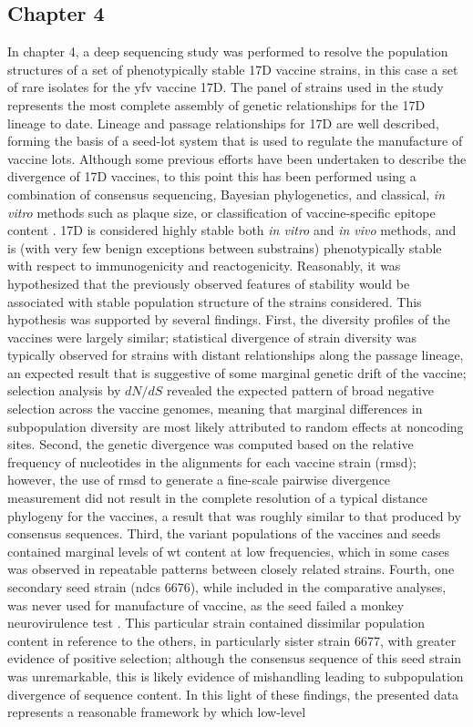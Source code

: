 \subsection{Chapter 4}
In chapter 4, a deep sequencing study was performed to resolve the population structures of a set of phenotypically stable 17D vaccine strains, in this case a set of rare isolates for the \gls{yfv} vaccine 17D. The panel of strains used in the study represents the most complete assembly of genetic relationships for the 17D lineage to date. Lineage and passage relationships for 17D are well described, forming the basis of a seed-lot system that is used to regulate the manufacture of vaccine lots. Although some previous efforts have been undertaken to describe the divergence of 17D vaccines, to this point this has been performed using a combination of consensus sequencing, Bayesian phylogenetics, and classical, \emph{in vitro} methods such as plaque size, or classification of vaccine-specific epitope content \parencite{Barban:2007hi, Stock:2012gp}. 17D is considered highly stable both \emph{in vitro} and \emph{in vivo} methods, and is (with very few benign exceptions between substrains) phenotypically stable with respect to immunogenicity and reactogenicity. Reasonably, it was hypothesized that the previously observed features of stability would be associated with stable population structure of the strains considered. This hypothesis was supported by several findings. First, the diversity profiles of the vaccines were largely similar; statistical divergence of strain diversity was typically observed for strains with distant relationships along the passage lineage, an expected result that is suggestive of some marginal genetic drift of the vaccine; selection analysis by $dN/dS$ revealed the expected pattern of broad negative selection across the vaccine genomes, meaning that marginal differences in subpopulation diversity are most likely attributed to random effects at noncoding sites. Second, the genetic divergence was computed based on the relative frequency of nucleotides in the alignments for each vaccine strain (\gls{rmsd}); however, the use of \gls{rmsd} to generate a fine-scale pairwise divergence measurement did not result in the complete resolution of a typical distance phylogeny for the vaccines, a result that was roughly similar to that produced by consensus sequences. Third, the variant populations of the vaccines and seeds contained marginal levels of \gls{wt} content at low frequencies, which in some cases was observed in repeatable patterns between closely related strains. Fourth, one secondary seed strain (\glspl{ndc} 6676), while included in the comparative analyses, was never used for manufacture of vaccine, as the seed failed a monkey neurovirulence test \parencite{Tauraso:1968vg,Monath:1983uk}. This particular strain contained dissimilar population content in reference to the others, in particularly sister strain 6677, with greater evidence of positive selection; although the consensus sequence of this seed strain was unremarkable, this is likely evidence of mishandling leading to subpopulation divergence of sequence content. In this light of these findings, the presented data represents a reasonable framework by which low-level 